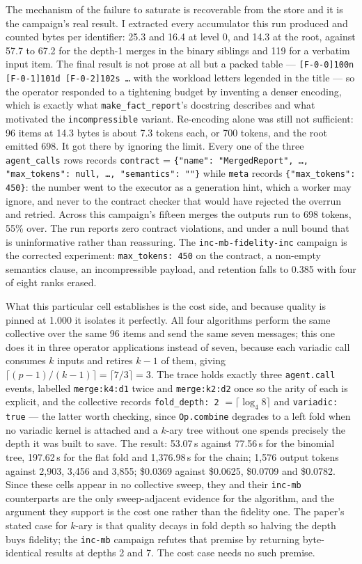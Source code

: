 \documentclass[11pt]{article}
\begin{document}
The mechanism of the failure to saturate is recoverable from the store and it is the
campaign's real result. I extracted every accumulator this run produced and counted bytes
per identifier: 25.3 and 16.4 at level 0, and 14.3 at the root, against 57.7 to 67.2 for
the depth-1 merges in the binary siblings and 119 for a verbatim input item. The final
result is not prose at all but a packed table --- \texttt{[F-0-0]100n [F-0-1]101d
[F-0-2]102s \dots} with the workload letters legended in the title --- so the operator
responded to a tightening budget by inventing a denser encoding, which is exactly what
\texttt{make\_fact\_report}'s docstring describes and what motivated the
\texttt{incompressible} variant. Re-encoding alone was still not sufficient: 96 items at
14.3 bytes is about 7.3 tokens each, or 700 tokens, and the root emitted 698. It got there
by ignoring the limit. Every one of the three \texttt{agent\_calls} rows records
\texttt{contract} = \texttt{\{"name": "MergedReport", \dots, "max\_tokens": null, \dots,
"semantics": ""\}} while \texttt{meta} records \texttt{\{"max\_tokens": 450\}}: the number
went to the executor as a generation hint, which a worker may ignore, and never to the
contract checker that would have rejected the overrun and retried. Across this campaign's
fifteen merges the outputs run to 698 tokens, 55\% over. The run reports zero contract
violations, and under a null bound that is uninformative rather than reassuring. The
\texttt{inc-mb-fidelity-inc} campaign is the corrected experiment: \texttt{max\_tokens:
450} on the contract, a non-empty semantics clause, an incompressible payload, and
retention falls to 0.385 with four of eight ranks erased.

What this particular cell establishes is the cost side, and because quality is pinned at
1.000 it isolates it perfectly. All four algorithms perform the same collective over the
same 96 items and send the same seven messages; this one does it in three operator
applications instead of seven, because each variadic call consumes $k$ inputs and retires
$k-1$ of them, giving $\lceil (p-1)/(k-1)\rceil = \lceil 7/3 \rceil = 3$. The trace holds
exactly three \texttt{agent.call} events, labelled \texttt{merge:k4:d1} twice and
\texttt{merge:k2:d2} once so the arity of each is explicit, and the collective records
\texttt{fold\_depth: 2} $=\lceil\log_4 8\rceil$ and \texttt{variadic: true} --- the latter
worth checking, since \texttt{Op.combine} degrades to a left fold when no variadic kernel
is attached and a $k$-ary tree without one spends precisely the depth it was built to save.
The result: 53.07\,s against 77.56\,s for the binomial tree, 197.62\,s for the flat fold and
1{,}376.98\,s for the chain; 1{,}576 output tokens against 2{,}903, 3{,}456 and 3{,}855;
\$0.0369 against \$0.0625, \$0.0709 and \$0.0782. Since these cells appear in no collective
sweep, they and their \texttt{inc-mb} counterparts are the only sweep-adjacent evidence for
the algorithm, and the argument they support is the cost one rather than the fidelity one.
The paper's stated case for $k$-ary is that quality decays in fold depth so halving the
depth buys fidelity; the \texttt{inc-mb} campaign refutes that premise by returning
byte-identical results at depths 2 and 7. The cost case needs no such premise.
\end{document}
